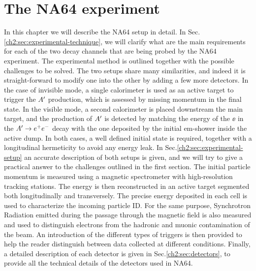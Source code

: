 
\newcommand{\pdirtwo}{chapters/plots/chapter2}

\chapter{The NA64 experiment} %

\label{chapter2} %


In this chapter we will describe the NA64 setup in detail. In Sec.\ref{ch2:sec:experimental-technique}, we will clarify what are the main requirements for each of the two decay channels that are being probed by the NA64 experiment. The experimental method is outlined together with the possible challenges to be solved. The two setups share many similarities, and indeed it is straight-forward to modify one into the other by adding a few more detectors. In the case of invisible mode, a single calorimeter is used as an active target to trigger the $A'$ production, which is assessed by missing momentum in the final state. In the visible mode, a second calorimeter is placed downstream the main target, and the production of $A'$ is detected by matching the energy of the $\ee$ in the $A' \to e^+e^-$ decay with the one deposited by the initial em-shower inside the active dump. In both cases, a well defined initial state is required, together with a longitudinal hermeticity to avoid any energy leak. In Sec.\ref{ch2:sec:experimental-setup} an accurate description of both setups is given, and we will try to give a practical answer to the challenges outlined in the first section. The initial particle momentum is measured using a magnetic spectrometer with high-resolution tracking stations. The energy is then reconstructed in an active target segmented both longitudinally and transversely. The precise energy deposited in each cell is used to characterize the incoming particle ID. For the same purpose, Synchrotron Radiation emitted during the passage through the magnetic field is also measured and used to distinguish electrons from the hadronic and muonic contamination of the beam. An introduction of the different types of triggers is then provided to help the reader distinguish between data collected at different conditions.
Finally, a detailed description of each detector is given in Sec.\ref{ch2:sec:detectors}, to provide all the technical details of the detectors used in NA64. 


